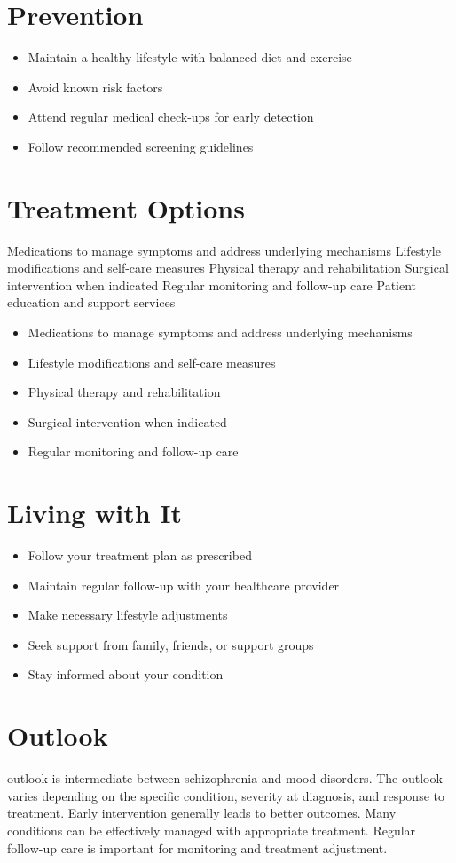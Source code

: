 \section{Prevention}
\begin{itemize}[noitemsep]
  \item Maintain a healthy lifestyle with balanced diet and exercise
  \item Avoid known risk factors
  \item Attend regular medical check-ups for early detection
  \item Follow recommended screening guidelines
\end{itemize}
\section{Treatment Options}
Medications to manage symptoms and address underlying mechanisms Lifestyle modifications and self-care measures Physical therapy and rehabilitation Surgical intervention when indicated Regular monitoring and follow-up care Patient education and support services

\begin{itemize}[noitemsep]
  \item Medications to manage symptoms and address underlying mechanisms
  \item Lifestyle modifications and self-care measures
  \item Physical therapy and rehabilitation
  \item Surgical intervention when indicated
  \item Regular monitoring and follow-up care
\end{itemize}
\section{Living with It}
\begin{itemize}[noitemsep]
  \item Follow your treatment plan as prescribed
  \item Maintain regular follow-up with your healthcare provider
  \item Make necessary lifestyle adjustments
  \item Seek support from family, friends, or support groups
  \item Stay informed about your condition
\end{itemize}
\section{Outlook}
outlook is intermediate between schizophrenia and mood disorders. The outlook varies depending on the specific condition, severity at diagnosis, and response to treatment. Early intervention generally leads to better outcomes. Many conditions can be effectively managed with appropriate treatment. Regular follow-up care is important for monitoring and treatment adjustment.
